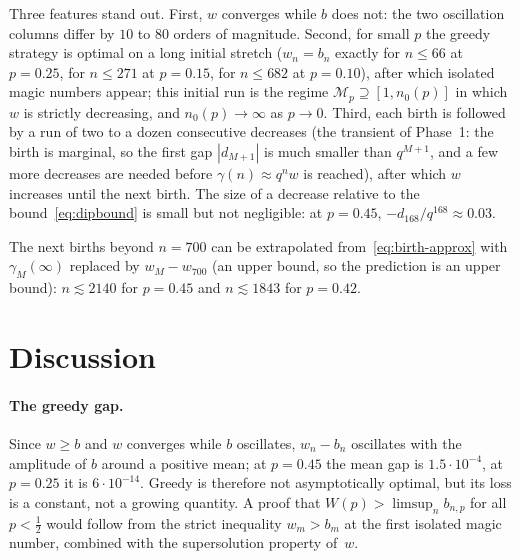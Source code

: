 \documentclass[11pt]{article}
\theoremstyle{definition}
\begin{document}
Three features stand out.  First, $w$ converges while $b$ does not: the
two oscillation columns differ by $10$ to $80$ orders of magnitude.
Second, for small $p$ the greedy strategy is optimal on a long initial
stretch ($w_n=b_n$ exactly for $n\le66$ at $p=0.25$, for $n\le271$ at
$p=0.15$, for $n\le682$ at $p=0.10$), after which isolated magic numbers
appear; this initial run is the regime $\mathcal M_p\supseteq[1,n_0(p)]$
in which $w$ is strictly decreasing, and $n_0(p)\to\infty$ as
$p\to0$.  Third, each birth is followed by a run of two to a dozen
consecutive decreases (the transient of Phase~1: the birth is marginal,
so the first gap $|d_{M+1}|$ is much smaller than $q^{M+1}$, and a few
more decreases are needed before $\gamma(n)\approx q^{n}w$ is
reached), after which $w$ increases until the next birth.  The size of
a decrease relative to the bound~\eqref{eq:dipbound} is small but not
negligible: at $p=0.45$, $-d_{168}/q^{168}\approx0.03$.

The next births beyond $n=700$ can be extrapolated
from~\eqref{eq:birth-approx} with $\gamma_M(\infty)$ replaced by
$w_M-w_{700}$ (an upper bound, so the prediction is an upper bound):
$n\lesssim2140$ for $p=0.45$ and $n\lesssim1843$ for $p=0.42$.

\section{Discussion}\label{sec:discussion}

\paragraph{The greedy gap.}  Since $w\ge b$ and $w$ converges while $b$
oscillates, $w_n-b_n$ oscillates with the amplitude of $b$ around a
positive mean; at $p=0.45$ the mean gap is $1.5\cdot10^{-4}$, at
$p=0.25$ it is $6\cdot10^{-14}$.  Greedy is therefore not asymptotically
optimal, but its loss is a constant, not a growing quantity.  A proof
that $W(p)>\limsup_n b_{n,p}$ for all $p<\tfrac12$ would follow from
the strict inequality $w_{m}>b_{m}$ at the first isolated magic number,
combined with the supersolution property of~$w$.
\end{document}
